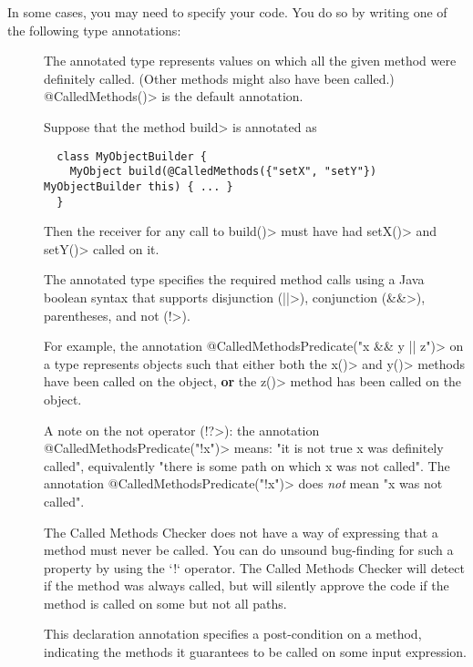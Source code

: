 In some cases, you may need to specify your code. You do so by writing one of the following type
annotations:
\begin{description}
\item[]
  The annotated type represents values on which all the given method were definitely called.
  (Other methods might also have been called.) \<@CalledMethods()> is the default annotation.

  Suppose that the method \<build> is annotated as

  \begin{Verbatim}
  class MyObjectBuilder {
    MyObject build(@CalledMethods({"setX", "setY"}) MyObjectBuilder this) { ... }
  }
  \end{Verbatim}

  Then the receiver for any call to \<build()> must have had \<setX()> and \<setY()> called on it.

\item[]
  The annotated type specifies the required method calls using a Java boolean syntax that supports
  disjunction (\<||>), conjunction (\<\&\&>), parentheses, and not (\<!>).

  For example, the annotation \<@CalledMethodsPredicate("x \&\& y || z")> on a type represents
  objects such that either both the  \<x()> and \<y()> methods have been called on the object, \textbf{or}
  the \<z()> method has been called on the object.

  A note on the not operator (\<!?>): the annotation \<@CalledMethodsPredicate("!x")> means: "it is not true x was
  definitely called", equivalently "there is some path on which x was not called".
  The annotation \<@CalledMethodsPredicate("!x")> does \emph{not} mean "x was not called".

  The Called Methods Checker does not have a way of expressing that a
  method must never be called.  You can do unsound bug-finding for such a
  property by using the `!` operator.  The Called Methods Checker will
  detect if the method was always called, but will silently approve the code
  if the method is called on some but not all paths.

\item[]
  This declaration annotation specifies a post-condition on a method, indicating the methods it
  guarantees to be called on some input expression.


\end{description}
